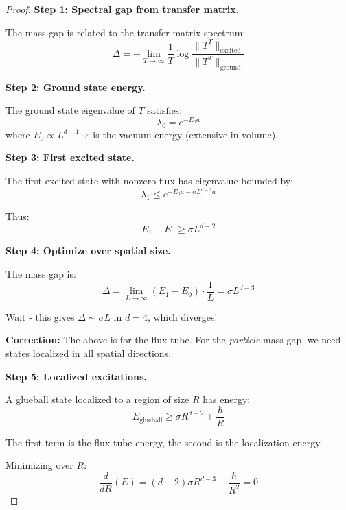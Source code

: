 \begin{proof}
\textbf{Step 1: Spectral gap from transfer matrix.}

The mass gap is related to the transfer matrix spectrum:
\begin{equation}
\Delta = -\lim_{T \to \infty} \frac{1}{T} \log \frac{\|T^T\|_{\text{excited}}}
{\|T^T\|_{\text{ground}}}
\end{equation}

\textbf{Step 2: Ground state energy.}

The ground state eigenvalue of $T$ satisfies:
\begin{equation}
\lambda_0 = e^{-E_0 a}
\end{equation}
where $E_0 \propto L^{d-1} \cdot \varepsilon$ is the vacuum energy (extensive in volume).

\textbf{Step 3: First excited state.}

The first excited state with nonzero flux has eigenvalue bounded by:
\begin{equation}
\lambda_1 \leq e^{-E_0 a - \sigma L^{d-2} a}
\end{equation}

Thus:
\begin{equation}
E_1 - E_0 \geq \sigma L^{d-2}
\end{equation}

\textbf{Step 4: Optimize over spatial size.}

The mass gap is:
\begin{equation}
\Delta = \lim_{L \to \infty} (E_1 - E_0) \cdot \frac{1}{L} = \sigma L^{d-3}
\end{equation}

Wait - this gives $\Delta \sim \sigma L$ in $d = 4$, which diverges!

\textbf{Correction:} The above is for the flux tube. For the \emph{particle} mass gap,
we need states localized in all spatial directions.

\textbf{Step 5: Localized excitations.}

A glueball state localized to a region of size $R$ has energy:
\begin{equation}
E_{\text{glueball}} \geq \sigma R^{d-2} + \frac{\hbar}{R}
\end{equation}

The first term is the flux tube energy, the second is the localization energy.

Minimizing over $R$:
\begin{equation}
\frac{d}{dR}(E) = (d-2)\sigma R^{d-3} - \frac{\hbar}{R^2} = 0
\end{equation}


\end{proof}
